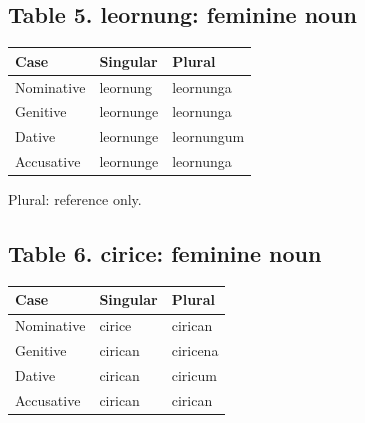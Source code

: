 \subsection*{Table 5. leornung: feminine noun}

\par\begingroup
\fontsize{10.5}{13.2}\selectfont
\setlength{\LTleft}{0pt}\setlength{\LTright}{\fill}
\noindent
\begin{tabular}{@{}>{\raggedright\arraybackslash}p{39.46mm}>{\raggedright\arraybackslash}p{39.46mm}>{\raggedright\arraybackslash}p{39.46mm}@{}}
\toprule
\textbf{Case} & \textbf{Singular} & \textbf{Plural} \\
\midrule
Nominative & leornung & leornunga \\
Genitive & leornunge & leornunga \\
Dative & leornunge & leornungum \\
Accusative & leornunge & leornunga \\
\bottomrule
\end{tabular}
\par\endgroup

Plural: reference only.

\subsection*{Table 6. cirice: feminine noun}

\par\begingroup
\fontsize{10.5}{13.2}\selectfont
\setlength{\LTleft}{0pt}\setlength{\LTright}{\fill}
\noindent
\begin{tabular}{@{}>{\raggedright\arraybackslash}p{39.46mm}>{\raggedright\arraybackslash}p{39.46mm}>{\raggedright\arraybackslash}p{39.46mm}@{}}
\toprule
\textbf{Case} & \textbf{Singular} & \textbf{Plural} \\
\midrule
Nominative & cirice & cirican \\
Genitive & cirican & ciricena \\
Dative & cirican & ciricum \\
Accusative & cirican & cirican \\
\bottomrule
\end{tabular}
\par\endgroup

